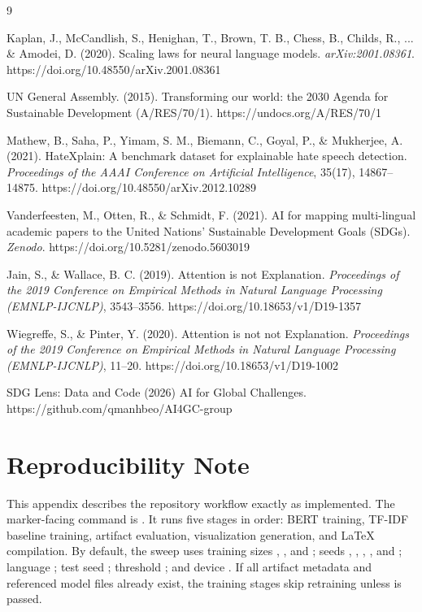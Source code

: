 \documentclass[12pt,a4paper]{article}
\begin{document}
\begin{thebibliography}{9}

\item Kaplan, J., McCandlish, S., Henighan, T., Brown, T. B., Chess, B., Childs, R., ... \& Amodei, D. (2020). Scaling laws for neural language models. \textit{arXiv:2001.08361}. https://doi.org/10.48550/arXiv.2001.08361

\item UN General Assembly. (2015). Transforming our world: the 2030 Agenda for Sustainable Development (A/RES/70/1). https://undocs.org/A/RES/70/1

\item Mathew, B., Saha, P., Yimam, S. M., Biemann, C., Goyal, P., \& Mukherjee, A. (2021). HateXplain: A benchmark dataset for explainable hate speech detection. \textit{Proceedings of the AAAI Conference on Artificial Intelligence}, 35(17), 14867--14875. https://doi.org/10.48550/arXiv.2012.10289

\item Vanderfeesten, M., Otten, R., \& Schmidt, F. (2021). AI for mapping multi-lingual academic papers to the United Nations' Sustainable Development Goals (SDGs). \textit{Zenodo}. https://doi.org/10.5281/zenodo.5603019

\item Jain, S., \& Wallace, B. C. (2019). Attention is not Explanation. \textit{Proceedings of the 2019 Conference on Empirical Methods in Natural Language Processing (EMNLP-IJCNLP)}, 3543--3556. https://doi.org/10.18653/v1/D19-1357

\item Wiegreffe, S., \& Pinter, Y. (2020). Attention is not not Explanation. \textit{Proceedings of the 2019 Conference on Empirical Methods in Natural Language Processing (EMNLP-IJCNLP)}, 11--20. https://doi.org/10.18653/v1/D19-1002

\item SDG Lens: Data and Code (2026) AI for Global Challenges. https://github.com/qmanhbeo/AI4GC-group

\end{thebibliography}

\appendix
\section{Reproducibility Note}

This appendix describes the repository workflow exactly as implemented. The marker-facing command is . It runs five stages in order: BERT training, TF-IDF baseline training, artifact evaluation, visualization generation, and LaTeX compilation. By default, the sweep uses training sizes , , and ; seeds , , , , and ; language ; test seed ; threshold ; and device . If all artifact metadata and referenced model files already exist, the training stages skip retraining unless  is passed.
\end{document}
